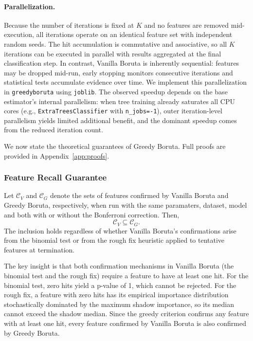 \documentclass[runningheads]{llncs}
\begin{document}
\paragraph{Parallelization.}
\label{sec:method:parallel}
Because the number of iterations is fixed at $K$ and no features are removed mid-execution, all iterations operate on an identical feature set with independent random seeds. The hit accumulation is commutative and associative, so all $K$ iterations can be executed in parallel with results aggregated at the final classification step. In contrast, Vanilla Boruta is inherently sequential: features may be dropped mid-run, early stopping monitors consecutive iterations and statistical tests accumulate evidence over time. We implement this parallelization in \texttt{greedyboruta} using \texttt{joblib}. The observed speedup depends on the base estimator's internal parallelism: when tree training already saturates all CPU cores (e.g., \texttt{ExtraTreesClassifier} with \texttt{n\_jobs=-1}), outer iteration-level parallelism yields limited additional benefit, and the dominant speedup comes from the reduced iteration count.

We now state the theoretical guarantees of Greedy Boruta. Full proofs are provided in Appendix~\ref{app:proofs}.

\subsubsection{Feature Recall Guarantee}

\begin{theorem}
\label{thm:recall}
Let $\mathcal{C}_V$ and $\mathcal{C}_G$ denote the sets of features confirmed by Vanilla Boruta and Greedy Boruta, respectively, when run with the same paramaters, dataset, model and both with or without the Bonferroni correction. Then, 
$$\mathcal{C}_V \subseteq \mathcal{C}_G.$$ 
The inclusion holds regardless of whether Vanilla Boruta's confirmations arise from the binomial test or from the rough fix heuristic applied to tentative features at termination. 
\end{theorem}

The key insight is that both confirmation mechanisms in Vanilla Boruta (the binomial test and the rough fix) require a feature to have at least one hit. For the binomial test, zero hits yield a p-value of 1, which cannot be rejected. For the rough fix, a feature with zero hits has its empirical importance distribution stochastically dominated \cite{levy1990stochastic} by the maximum shadow importance, so its median cannot exceed the shadow median. Since the greedy criterion confirms any feature with at least one hit, every feature confirmed by Vanilla Boruta is also confirmed by Greedy Boruta.
\end{document}
